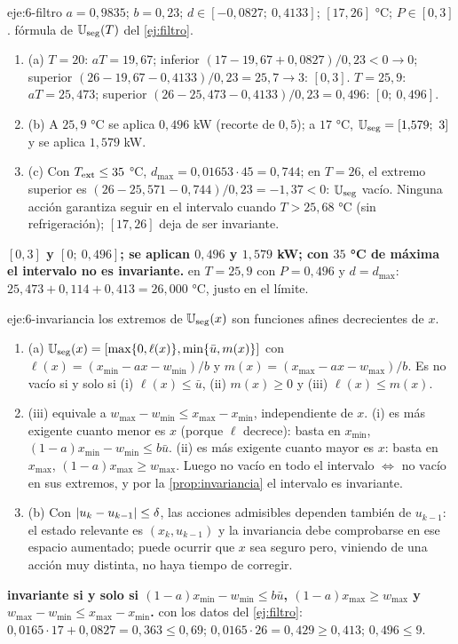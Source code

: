 \begin{solucion}{eje:6-filtro}
\datos $a=0{,}9835$; $b=0{,}23$; $d\in[-0{,}0827;\ 0{,}4133]$; $[17,26]$ °C; $P\in[0,3]$.
\planteamiento fórmula de $\mathbb{U}_{\mathrm{seg}}(T)$ del \cref{ej:filtro}.
\pasos
\begin{enumerate}[label=\arabic*.]
  \item (a) $T=20$: $aT=19{,}67$; inferior $(17-19{,}67+0{,}0827)/0{,}23<0\to0$; superior $(26-19{,}67-0{,}4133)/0{,}23=25{,}7\to3$: $[0,3]$. $T=25{,}9$: $aT=25{,}473$; superior $(26-25{,}473-0{,}4133)/0{,}23=0{,}496$: $[0;\ 0{,}496]$.
  \item (b) A $25{,}9$ °C se aplica $0{,}496$ kW (recorte de $0{,}5$); a $17$ °C, $\Uset_{\mathrm{seg}}=[1{,}579;\ 3]$ y se aplica $1{,}579$ kW.
  \item (c) Con $T_{\mathrm{ext}}\le35$ °C, $d_{\max}=0{,}01653\cdot45=0{,}744$; en $T=26$, el extremo superior es $(26-25{,}571-0{,}744)/0{,}23=-1{,}37<0$: $\mathbb{U}_{\mathrm{seg}}$ vacío. Ninguna acción garantiza seguir en el intervalo cuando $T>25{,}68$ °C (sin refrigeración); $[17,26]$ deja de ser invariante.
\end{enumerate}
\resultado \textbf{$[0,3]$ y $[0;\ 0{,}496]$; se aplican $0{,}496$ y $1{,}579$ kW; con $35$ °C de máxima el intervalo no es invariante.}
\comprobacion en $T=25{,}9$ con $P=0{,}496$ y $d=d_{\max}$: $25{,}473+0{,}114+0{,}413=26{,}000$ °C, justo en el límite.
\end{solucion}

\begin{solucion}{eje:6-invariancia}
\planteamiento los extremos de $\mathbb{U}_{\mathrm{seg}}(x)$ son funciones afines decrecientes de $x$.
\pasos
\begin{enumerate}[label=\arabic*.]
  \item (a) $\mathbb{U}_{\mathrm{seg}}(x)=[\max\{0,\ell(x)\},\min\{\bar u,m(x)\}]$ con $\ell(x)=(x_{\min}-ax-w_{\min})/b$ y $m(x)=(x_{\max}-ax-w_{\max})/b$. Es no vacío si y solo si (i) $\ell(x)\le\bar u$, (ii) $m(x)\ge0$ y (iii) $\ell(x)\le m(x)$.
  \item (iii) equivale a $w_{\max}-w_{\min}\le x_{\max}-x_{\min}$, independiente de $x$. (i) es más exigente cuanto menor es $x$ (porque $\ell$ decrece): basta en $x_{\min}$, $(1-a)x_{\min}-w_{\min}\le b\bar u$. (ii) es más exigente cuanto mayor es $x$: basta en $x_{\max}$, $(1-a)x_{\max}\ge w_{\max}$. Luego no vacío en todo el intervalo $\iff$ no vacío en sus extremos, y por la \cref{prop:invariancia} el intervalo es invariante.
  \item (b) Con $\lvert u_k-u_{k-1}\rvert\le\delta$, las acciones admisibles dependen también de $u_{k-1}$: el estado relevante es $(x_k,u_{k-1})$ y la invariancia debe comprobarse en ese espacio aumentado; puede ocurrir que $x$ sea seguro pero, viniendo de una acción muy distinta, no haya tiempo de corregir.
\end{enumerate}
\resultado \textbf{invariante si y solo si $(1-a)x_{\min}-w_{\min}\le b\bar u$, $(1-a)x_{\max}\ge w_{\max}$ y $w_{\max}-w_{\min}\le x_{\max}-x_{\min}$.}
\comprobacion con los datos del \cref{ej:filtro}: $0{,}0165\cdot17+0{,}0827=0{,}363\le0{,}69$; $0{,}0165\cdot26=0{,}429\ge0{,}413$; $0{,}496\le9$.
\end{solucion}

